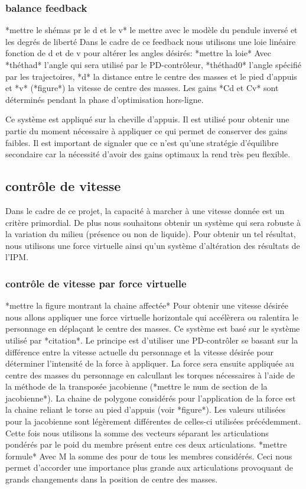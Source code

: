 \documentclass{llncs}
\begin{document}
%
\subsubsection{balance feedback}
%
*mettre le shémas pr le d et le v* le mettre avec le modèle du pendule inversé et les degrés de liberté
Dans le cadre de ce feedback nous utilisons une loie linéaire fonction de d et de v pour altérer les angles désirés:
*mettre la loie*
Avec *théthad* l'angle qui sera utilisé par le PD-contrôleur, *théthad0* l'angle spécifié par les trajectoires, *d* la distance entre le centre des masses et le pied d'appuis et *v* (*figure*) la vitesse de centre des masses.
Les gains *Cd et Cv* sont déterminés pendant la phase d'optimisation hors-ligne. 

Ce système est appliqué sur la cheville d'appuis. Il est utilisé pour obtenir une partie du moment nécessaire à appliquer ce qui permet de conserver des gains faibles. Il est important de signaler que ce n'est qu'une stratégie d'équilibre secondaire car la nécessité d'avoir des gains optimaux la rend très peu flexible. 
%
\subsection{contrôle de vitesse}
%
Dans le cadre de ce projet, la capacité à marcher à une vitesse donnée est un critère primordial. De plus nous souhaitons obtenir un système qui sera robuste à la variation du milieu (présence ou non de liquide). Pour obtenir un tel résultat, nous utilisons une force virtuelle ainsi qu'un système d'altération des résultats de l'IPM.
%
\subsubsection{contrôle de vitesse par force virtuelle}
%
*mettre la figure montrant la chaine affectée*
Pour obtenir une vitesse désirée nous allons appliquer une force virtuelle horizontale qui accélèrera ou ralentira le personnage en déplaçant le centre des masses. Ce système est basé sur le système utilisé par *citation*.
Le principe est d'utiliser une PD-contrôler se basant sur la différence entre la vitesse actuelle du personnage et la vitesse désirée pour déterminer l'intensité de la force à appliquer. La force sera ensuite appliquée au centre des masses du personnage en calcullant les torques nécessaires à l'aide de la méthode de la transposée jacobienne (*mettre le num de section de la jacobienne*). La chaine de polygone considérés pour l'application de la force est la chaine reliant le torse au pied d'appuis (voir *figure*). Les valeurs utilisées pour la jacobienne sont légèrement différentes de celles-ci utilisées précédemment. Cette fois nous utilisons la somme des vecteurs séparant les articulations pondérés par le poid du membre présent entre ces deux articulations.
*mettre formule*
Avec M la somme des pour de tous les membres considérés. Ceci nous permet d'accorder une importance plus grande aux articulations provoquant de grands changements dans la position de centre des masses. 
\end{document}
